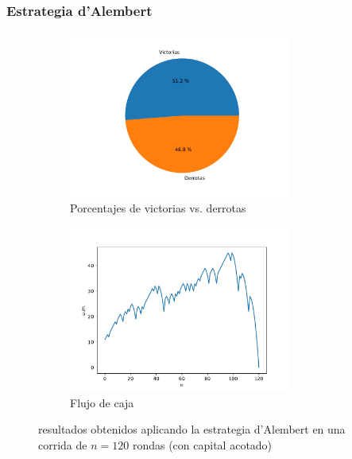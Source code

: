 \documentclass{article}
\begin{document}
  \subsubsection{Estrategia d’Alembert}
  \begin{figure}[H]
    \centering
    \begin{subfigure}{0.5\textwidth}
      \centering
      \includegraphics[width=0.8\textwidth]{generated/porcentajes-d'alembert-acotado.pdf}
      \caption{Porcentajes de victorias vs. derrotas}
    \end{subfigure}%
    \begin{subfigure}{0.5\textwidth}
      \centering
      \includegraphics[width=0.8\textwidth]{generated/capital-d'alembert-acotado.pdf}
      \caption{Flujo de caja}
    \end{subfigure}
    \caption{resultados obtenidos aplicando la estrategia d’Alembert en una corrida de $n = 120$ rondas (con capital acotado)}
  \end{figure}
\end{document}
